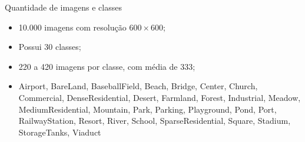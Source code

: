     \begin{frame}{Quantidade de imagens e classes}
        \begin{itemize}
            \item 10.000 imagens com resolução \(600\times600\);

            \item Possui 30 classes;

            \item 220 a 420 imagens por classe, com média de 333;
            
            \item Airport, BareLand, BaseballField, Beach, Bridge, Center, Church, Commercial, DenseResidential, Desert, Farmland, Forest, Industrial, Meadow, MediumResidential, Mountain, Park, Parking, Playground, Pond, Port, RailwayStation, Resort, River, School, SparseResidential, Square, Stadium, StorageTanks, Viaduct
        \end{itemize}
    \end{frame}



